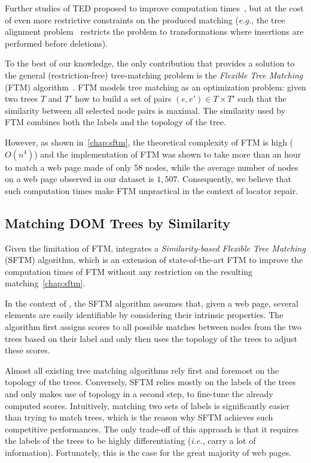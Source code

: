 Further studies of TED proposed to improve computation times~\cite{jiang1995alignment, valiente2001efficient, zhang1996constrained}, but at the cost of even more restrictive constraints on the produced matching (\emph{e.g.}, the tree alignment problem~\cite{jiang1995alignment} restricts the problem to transformations where insertions are performed before deletions).

To the best of our knowledge, the only contribution that provides a solution to the general (restriction-free) tree-matching problem is the \emph{Flexible Tree Matching} (FTM) algorithm~\cite{Kumar2011_FTM}.
FTM models tree matching as an optimization problem: given two trees $T$ and $T'$ how to build a set of pairs $(e,e') \in T \times T'$ such that the similarity between all selected node pairs is maximal.
The similarity used by FTM combines both the labels and the topology of the tree.

However, as shown in~\ref{chap:sftm}, the theoretical complexity of FTM is high ($O(n^4)$) and the implementation of FTM was shown to take more than an hour to match a web page made of only 58 nodes, while the average number of nodes on a web page observed in our dataset is $1,507$.
Consequently, we believe that such computation times make FTM unpractical in the context of locator repair.


\subsection{Matching DOM Trees by Similarity}\label{sec:SFTM}
Given the limitation of FTM, \erratum{} integrates a \emph{Similarity-based Flexible Tree Matching} (SFTM) algorithm, which is an extension of state-of-the-art FTM to improve the computation times of FTM without any restriction on the resulting matching~\ref{chap:sftm}. 

In the context of \erratum{}, the SFTM algorithm assumes that, given a web page, several elements are easily identifiable by considering their intrinsic properties.
The algorithm first assigns scores to all possible matches between nodes from the two trees based on their label and only then uses the topology of the trees to adjust these scores.

Almost all existing tree matching algorithms rely first and foremost on the topology of the trees.
Conversely, SFTM relies mostly on the labels of the trees and only makes use of topology in a second step, to fine-tune the already computed scores. Intuitively, matching two sets of labels is significantly easier than trying to match trees, which is the reason why SFTM achieves such competitive performances.
The only trade-off of this approach is that it requires the labels of the trees to be highly differentiating (\emph{i.e.}, carry a lot of information). 
Fortunately, this is the case for the great majority of web pages.

